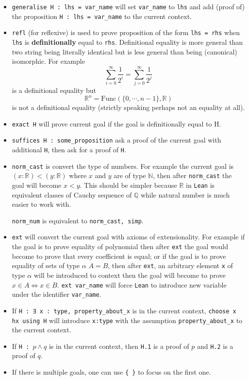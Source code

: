 \documentclass{report}
\theoremstyle{definition}
\theoremstyle{plain}
\begin{document}
\begin{itemize}
\begin{itemize}
    {\tt replace H : some\_proposition} will add one more goal of proving {\tt some\_proposition} and then replace {\tt H} to the proposition proven.
    \item {\tt generalise H : lhs = var\_name} will set {\tt var\_name} to {\tt lhs} and add (proof of) the proposition {\tt H : lhs = var\_name} to the current context.
    \item {\tt refl} (for reflexive) is used to prove proposition of the form {\tt lhs = rhs} when {\tt lhs} is {\bf definitionally} equal to {\tt rhs}. Definitional equality is more general than two string being literally identical but is less general than being (canonical) isomorphic. For example
    $$
  \sum_{i=0}^\infty \frac{1}{2^i}=\sum_{j=0}^\infty \frac{1}{2^j}
    $$
    is a definitional equality but
    $$
  \mathbb R^n = \mathrm{Func}\left(\{0,\cdots, n-1\},\mathbb R\right)
    $$ is not a definitional equality (strictly speaking perhaps not an equality at all).
  \item {\tt exact H} will prove current goal if the goal is definitionally equal to H. 
  \item {\tt suffices H : some\_proposition} ask a proof of the current goal with additional {\tt H}, then ask for a proof of {\tt H}.
  \item {\tt norm\_cast} is convert the type of numbers. For example the current goal is $(x:\mathbb R)<(y:\mathbb R)$ where $x$ and $y$ are of type $\mathbb N$, then after {\tt norm\_cast} the goal will become $x<y$. This should be simpler because $\mathbb R$ in {\tt Lean} is equivalent classes of Cauchy sequence of $\mathbb Q$ while natural number is much easier to work with.
  
  {\tt norm\_num} is equivalent to {\tt norm\_cast, simp}.
  \item {\tt ext} will convert the current goal with axioms of extensionality. For example if the goal is to prove equality of polynomial then after {\tt ext} the goal would become to prove that every coefficient is equal; or if the goal is to prove equality of sets of type $\alpha$ $A=B$, then after {\tt ext}, an arbitrary element {\tt x} of type $\alpha$ will be introduced to context then the goal will become to prove $x\in A\iff x\in B$. {\tt ext var\_name} will force {\tt Lean} to introduce new variable under the identifier {\tt var\_name}.
  \item If {\tt H : ∃ x : type, property\_about\_x} is in the current context, {\tt choose x hx using H} will introduce {\tt x:type} with the assumption {\tt property\_about\_x} to the current context. 
  \item If {\tt H : $p\land q$} is in the current context, then {\tt H.1} is a proof of $p$ and {\tt H.2} is a proof of $q$.
  \item If there is multiple goals, one can use {\tt \{ \}} to focus on the first one.
  \end{itemize}
\end{itemize}
\end{document}
